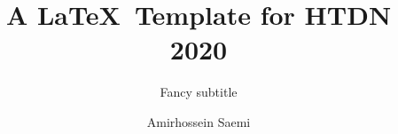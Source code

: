 \documentclass[10pt,sigconf]{acmart}
\begin{document}
\title{A \LaTeX\ Template for HTDN 2020}

\subtitle{Fancy subtitle}
 \author{Amirhossein Saemi}


\begin{abstract}
    \blindtext
\end{abstract}

\maketitle





\end{document}

